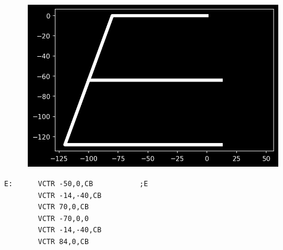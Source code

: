 \begin{minipage}[c]{0.48\linewidth}
\begin{figure}[H]
    \centering
    \begin{adjustbox}{width=4cm,center}
      \includegraphics[width=12cm]{src/titles/letters/E.png}%
    \end{adjustbox}
\end{figure}
\end{minipage}
\begin{minipage}[c]{0.48\linewidth}
\begin{lstlisting}[basicstyle=\scriptsize\ttfamily]
E:      VCTR -50,0,CB           ;E
        VCTR -14,-40,CB
        VCTR 70,0,CB
        VCTR -70,0,0
        VCTR -14,-40,CB
        VCTR 84,0,CB
\end{lstlisting}
\vspace*{\fill}
\end{minipage}

